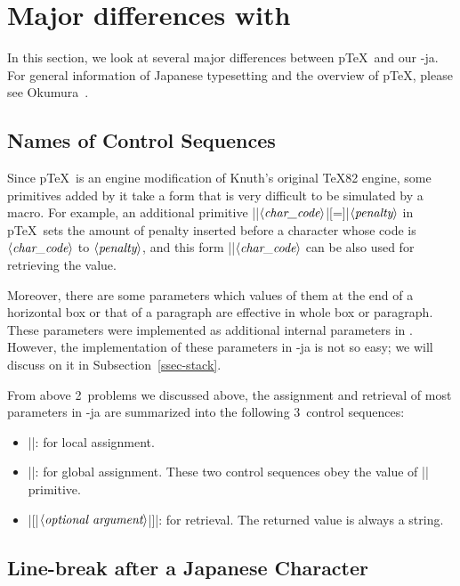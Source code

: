 \documentclass{ajt}
\begin{document}
\section{Major differences with \pTeX}
In this section, we look at several major differences between p\TeX\
and our \LuaTeX-ja.  For general information of Japanese typesetting and the
overview of p\TeX, please see Okumura~\cite{ptexjp}.


\subsection{Names of Control Sequences}
\label{ssec-csname} Since p\TeX\ is an engine modification of Knuth's
original \TeX82 engine, some primitives added by it take a form that is
very difficult to be simulated by a macro.  For example, an additional
primitive |\prebreakpenalty|$\langle\hbox{\it
char\_code}\rangle$|[=]|$\langle\hbox{\it penalty}\rangle$ in p\TeX\
sets the amount of penalty inserted before a character whose code is
$\langle\hbox{\it char\_code}\rangle$ to $\langle\hbox{\it
penalty}\rangle$, and this form |\prebreakpenalty|$\langle\hbox{\it
char\_code}\rangle$ can be also used for retrieving the value.

Moreover, there are some parameters which values of them at the end of a
horizontal box or that of a paragraph are effective in whole box or
paragraph.  These parameters were implemented as additional internal
parameters in \pTeX. However, the implementation of these parameters in
\LuaTeX-ja is not so easy; we will discuss on it in
Subsection~\ref{ssec-stack}.

From above 2~problems we discussed above, the assignment and retrieval
of most parameters in \LuaTeX-ja are summarized into the following
3~control sequences:
\begin{itemize}
\item ||: for local
      assignment.
\item |\ltjglobalsetparameter|: for global assignment. These two control
      sequences obey the value of |\globaldefs| primitive.
\item |\ltjgetparameter{|$\langle\hbox{\it
      name}\rangle$|}[{|$\langle\hbox{\it optional
      argument}\rangle$|}]|: for retrieval. The returned value is always
      a string.
\end{itemize}

\subsection{Line-break after a Japanese Character}
\label{ssec-line} 
\end{document}
